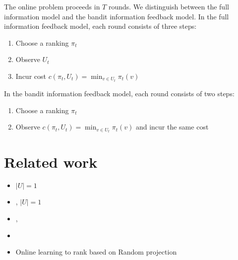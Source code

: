 \documentclass{article}
\begin{document}
The online problem proceeds in $T$ rounds. We distinguish between the
full information model and the bandit information feedback model.
In the full information feedback model, each round consists of three steps:
\begin{enumerate}
\item Choose a ranking $\pi_t$
\item Observe $U_t$
\item Incur cost $c(\pi_t, U_t) = \min_{v \in U_t} \pi_t(v)$
\end{enumerate}
In the bandit information feedback model, each round consists of two steps:
\begin{enumerate}
\item Choose a ranking $\pi_t$
\item Observe $c(\pi_t, U_t) = \min_{v \in U_t} \pi_t(v)$ and incur the same cost
\end{enumerate}


\section{Related work}

\begin{itemize}
\item \cite{Ailon-2014} $|U| = 1$
\item \cite{Helmbold-Warmuth-2009}, \cite{Yasutake-Hatano-Kijima-Takimoto-Takeda-2011} $|U| = 1$
\item \cite{Feige-Lovasz-Tetali-2004}, \cite{Azar-Gamzu-Yin-2009}
\item \cite{Radlinski-Kleinberg-Joachims-2008}
\item Online learning to rank based on Random projection \cite{Schuth-Oosterhuis-Whiteson-de-Rijke-2016}
\end{itemize}



\end{document}
